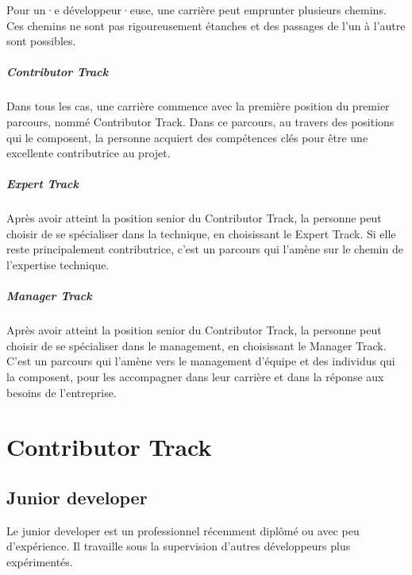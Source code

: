\documentclass[a4paper, french, openany, 12pt]{book}
\newcommand\dev{développeur·euse}
\begin{document}
\begin{multicols}{2}
  Pour un·e \dev, une carrière peut emprunter plusieurs chemins.
  Ces chemins ne sont pas rigoureusement étanches et des passages de l'un à l'autre sont possibles.

  \subsubsection*{Contributor Track}

  Dans tous les cas, une carrière commence avec la première position du premier parcours, nommé Contributor Track.
  Dans ce parcours, au travers des positions qui le composent, la personne acquiert des compétences clés pour être une
  excellente contributrice au projet.

  \subsubsection*{Expert Track}

  Après avoir atteint la position senior du Contributor Track, la personne peut choisir de se spécialiser 
  dans la technique, en choisissant le Expert Track.
  Si elle reste principalement contributrice, c'est un parcours qui l'amène sur le chemin de l'expertise technique.

  \subsubsection*{Manager Track}

  Après avoir atteint la position senior du Contributor Track, la personne peut choisir de se spécialiser 
  dans le management, en choisissant le Manager Track.
  C'est un parcours qui l'amène vers le management d'équipe et des individus qui la composent, pour les
  accompagner dans leur carrière et dans la réponse aux besoins de l'entreprise.

\end{multicols}

\part{Contributor Track}

\chapter{Junior developer}

Le junior developer est un professionnel récemment diplômé ou avec peu d’expérience. 
Il travaille sous la supervision d'autres développeurs plus expérimentés.
\end{document}
